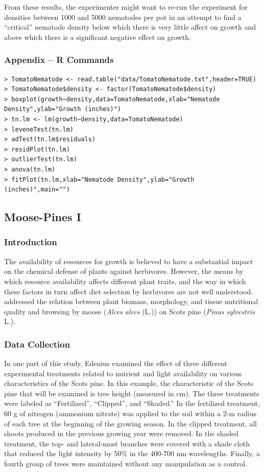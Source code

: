 \documentclass[10pt,openany]{book}\usepackage[]{graphicx}\usepackage[]{color}
\begin{document}
From these results, the experimenter might want to re-run the experiment for densities between 1000 and 5000 nematodes per pot in an attempt to find a ``critical'' nematode density below which there is very little affect on growth and above which there is a significant negative effect on growth.

\subsubsection*{Appendix -- R Commands}
\begin{Verbatim}[formatcom=\color{red},xleftmargin=5mm,commandchars=\\\{\}]
> TomatoNematode <- read.table("data/TomatoNematode.txt",header=TRUE)
> TomatoNematode$density <- factor(TomatoNematode$density)
> boxplot(growth~density,data=TomatoNematode,xlab="Nematode Density",ylab="Growth (inches)")
> tn.lm <- lm(growth~density,data=TomatoNematode)
> leveneTest(tn.lm)
> adTest(tn.lm$residuals)
> residPlot(tn.lm)
> outlierTest(tn.lm)
> anova(tn.lm)
> fitPlot(tn.lm,xlab="Nematode Density",ylab="Growth (inches)",main="")
\end{Verbatim}

\subsection{Moose-Pines I} \label{sect:OWAEx2A}
\subsubsection*{Introduction}


The availability of resources for growth is believed to have a substantial impact on the chemical defense of plants against herbivores.  However, the means by which resource availability affects different plant traits, and the way in which these factors in turn affect diet selection by herbivores are not well understood.  \cite{Edenius1993} addressed the relation between plant biomass, morphology, and tissue nutritional quality and browsing by moose (\emph{Alces alces} (L.)) on Scots pine (\emph{Pinus sylvestris} L.).

\subsubsection*{Data Collection}
In one part of this study, Edenius examined the effect of three different experimental treatments related to nutrient and light availability on various characteristics of the Scots pine.  In this example, the characteristic of the Scots pine that will be examined is tree height (measured in cm).  The three treatments were labeled as ``Fertilized'', ``Clipped'', and ``Shaded.''  In the fertilized treatment, 60 g of nitrogen (ammonium nitrate) was applied to the soil within a 2-m radius of each tree at the beginning of the growing season.  In the clipped treatment, all shoots produced in the previous growing year were removed.  In the shaded treatment, the top- and lateral-most branches were covered with a shade cloth that reduced the light intensity by 50\% in the 400-700 nm wavelengths.  Finally, a fourth group of trees were maintained without any manipulation as a control.
\end{document}

